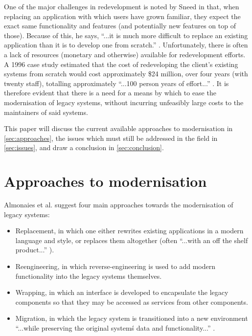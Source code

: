 \documentclass[12pt,journal,compsoc]{IEEEtran}
\begin{document}
One of the major challenges in redevelopment is noted by Sneed \cite{Sneed2011} in that, when replacing an application with which users have grown familiar, they expect the exact same functionality and features (and potentially new features on top of those). Because of this, he says, ``...it is much more difficult to replace an existing application than it is to develop one from scratch.'' \cite{Sneed2011}. Unfortunately, there is often a lack of resources (monetary and otherwise) available for redevelopment efforts. A 1996 case study \cite{Duncan1996} estimated that the cost of redeveloping the client's existing systems from scratch would cost approximately \$24 million, over four years (with twenty staff), totalling approximately ``...100 person years of effort...'' \cite{Duncan1996}. It is therefore evident that there is a need for a means by which to ease the modernisation of legacy systems, without incurring unfeasibly large costs to the maintainers of said systems.

This paper will discuss the current available approaches to modernisation in \autoref{sec:approaches}, the issues which must still be addressed in the field in \autoref{sec:issues}, and draw a conclusion  in \autoref{sec:conclusion}.

\section{Approaches to modernisation}
\label{sec:approaches}

Almonaies et al. \cite{Almonaies2010} suggest four main approaches towards the modernisation of legacy systems:
\begin{itemize}
\item Replacement, in which one either rewrites existing applications in a modern language and style, or replaces them altogether (often ``...with an off the shelf product...'' \cite{Almonaies2010}).
\item Reengineering, in which reverse-engineering is used to add modern functionality into the legacy systems themselves.
\item Wrapping, in which an interface is developed to encapsulate the legacy components so that they may be accessed as services from other components.
\item Migration, in which the legacy system is transitioned into a new environment ``...while preserving the original system\'s data and functionality...'' \cite{Almonaies2010}.
\end{itemize}
\end{document}

